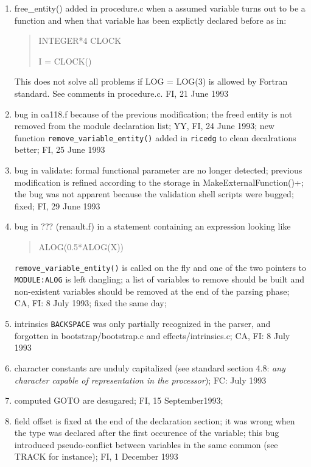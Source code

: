 \begin{enumerate}
  \item free_entity() added in procedure.c when a assumed variable turns
	out to be a function and when that variable has been explictly 
	declared before as in:
\begin{quote}
INTEGER*4 CLOCK

I = CLOCK()
\end{quote}
	This does not solve all problems if LOG = LOG(3) is allowed
	by Fortran standard. See comments in procedure.c.
	FI, 21 June 1993

  \item bug in oa118.f because of the previous modification; the freed
	entity is not removed from the module declaration list; YY, FI,
	24 June 1993; new function \verb+remove_variable_entity()+
	added in \verb+ricedg+ to clean decalrations better; FI, 25 June
	1993

  \item bug in validate: formal functional parameter are no longer
	detected; previous modification is refined according to the
	storage in MakeExternalFunction()+; the bug was not apparent
	because the validation shell scripts were bugged; fixed; FI, 29
	June 1993

  \item bug in ??? (renault.f) in a statement containing an expression looking like
\begin{quote}
ALOG(0.5*ALOG(X))
\end{quote}
	\verb+remove_variable_entity()+ is called on the fly and one of
	the two pointers to \verb+MODULE:ALOG+ is left dangling; a list
	of variables to remove should be built and non-existent
	variables should be removed at the end of the parsing phase;
	CA, FI: 8 July 1993; fixed the same day;

  \item intrinsics \verb+BACKSPACE+ was only partially recognized in the
	parser, and forgotten in bootstrap/bootstrap.c and
	effects/intrinsics.c; CA, FI: 8 July 1993
	
  \item character constants are unduly capitalized (see standard section
	4.8: {\em any character capable of representation in the processor});
	FC: July 1993

  \item computed GOTO are desugared; FI, 15 September1993;

  \item field offset is fixed at the end of the declaration section; it
	was wrong when the type was declared after the first occurence
	of the variable; this bug introduced pseudo-conflict between
	variables in the same common (see TRACK for instance); FI, 1 December 1993


\end{enumerate}
